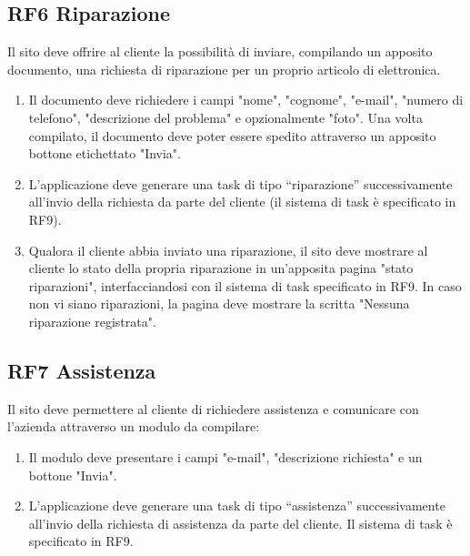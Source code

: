 \documentclass{report}
\begin{document}
\subsection*{RF6 Riparazione}

Il sito deve offrire al cliente la possibilità di inviare, compilando un apposito documento, una richiesta di riparazione per un proprio articolo di elettronica.
\begin{enumerate}


	\item Il documento deve richiedere i campi "nome", "cognome", "e-mail", "numero di telefono", "descrizione del problema" e opzionalmente "foto". Una volta compilato, il documento deve poter essere spedito attraverso un apposito bottone etichettato "Invia".
	
	\item L’applicazione deve generare una task di tipo “riparazione” successivamente all’invio della richiesta da parte del cliente (il sistema di task è specificato in RF9).
	
	\item Qualora il cliente abbia inviato una riparazione, il sito deve mostrare al cliente lo stato della propria riparazione in un'apposita pagina "stato riparazioni", interfacciandosi con il sistema di task specificato in RF9. In caso non vi siano riparazioni, la pagina deve mostrare la scritta "Nessuna riparazione registrata".
	
\end{enumerate}

\subsection*{RF7 Assistenza}
Il sito deve permettere al cliente di richiedere assistenza e comunicare con l'azienda attraverso un modulo da compilare:

\begin{enumerate}
	\item Il modulo deve presentare i campi "e-mail", "descrizione richiesta" e un bottone "Invia".
	
	\item L’applicazione deve generare una task di tipo “assistenza” successivamente all’invio della richiesta di assistenza da parte del cliente. Il sistema di task è specificato in RF9.
	
	
\end{enumerate}
\end{document}
